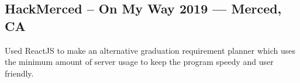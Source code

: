 \documentclass[../Resume.tex]{subfiles}
\begin{document}
	\subsection{HackMerced -- On My Way \null\hfill 2019 --- Merced, CA}
	\par Used ReactJS to make an alternative graduation requirement planner which uses the minimum amount of server usage to keep the program speedy and user friendly.
	\vspace*{-2mm}
\end{document}
